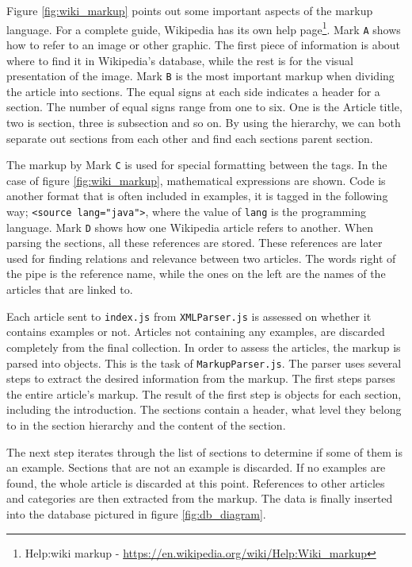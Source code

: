 Figure \ref{fig:wiki_markup} points out some important aspects of the markup language. For a complete guide, Wikipedia has its own help page\footnote{Help:wiki markup - \url{https://en.wikipedia.org/wiki/Help:Wiki_markup}}. Mark \texttt{A} shows how to refer to an image or other graphic. The first piece of information is about where to find it in Wikipedia's database, while the rest is for the visual presentation of the image. Mark \texttt{B} is the most important markup when dividing the article into sections. The equal signs at each side indicates a header for a section. The number of equal signs range from one to six. One is the Article title, two is section, three is subsection and so on. By using the hierarchy, we can both separate out sections from each other and find each sections parent section.

The markup by Mark \texttt{C} is used for special formatting between the tags. In the case of figure \ref{fig:wiki_markup}, mathematical expressions are shown. Code is another format that is often included in examples, it is tagged in the following way; \texttt{<source lang="java">}, where the value of \texttt{lang} is the programming language. Mark \texttt{D} shows how one Wikipedia article refers to another. When parsing the sections, all these references are stored. These references are later used for finding relations and relevance between two articles. The words right of the pipe is the reference name, while the ones on the left are the names of the articles that are linked to. 


Each article sent to \texttt{index.js} from \texttt{XMLParser.js} is assessed on whether it contains examples or not. Articles not containing any examples, are discarded completely from the final collection. In order to assess the articles, the markup is parsed into objects. This is the task of \texttt{MarkupParser.js}. The parser uses several steps to extract the desired information from the markup. The first steps parses the entire article's markup. The result of the first step is objects for each section, including the introduction. The sections contain a header, what level they belong to in the section hierarchy and the content of the section. 

The next step iterates through the list of sections to determine if some of them is an example. Sections that are not an example is discarded. If no examples are found, the whole article is discarded at this point. References to other articles and categories are then extracted from the markup. The data is finally inserted into the database pictured in figure \ref{fig:db_diagram}.



